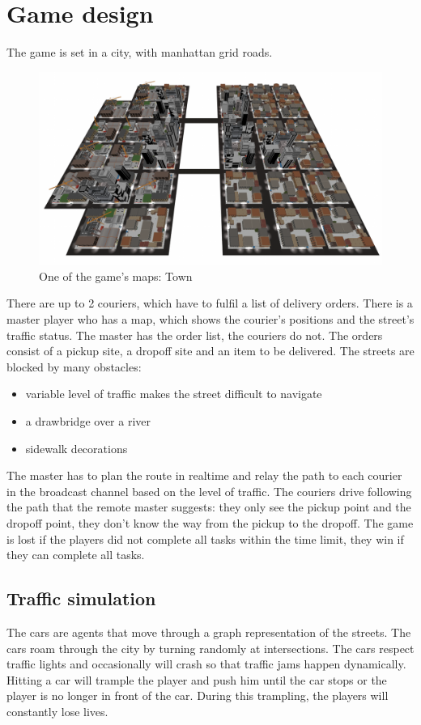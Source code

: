 \documentclass[12pt]{article}
\begin{document}
\section{Game design}
The game is set in a city, with manhattan grid roads.
\begin{figure}[H]
\includegraphics[width=\textwidth]{map_town}
\caption{One of the game's maps: Town}
\end{figure}
There are up to 2 couriers, which have to fulfil a list of delivery orders.
There is a master player who has a map, which shows the courier's positions and the street's traffic status. The master has the order list, the couriers do not.
The orders consist of a pickup site, a dropoff site and an item to be delivered.
The streets are blocked by many obstacles:
\begin{itemize}
  \item variable level of traffic makes the street difficult to navigate
  \item a drawbridge over a river
  \item sidewalk decorations
\end{itemize}
The master has to plan the route in realtime and relay the path to each courier in the broadcast channel based on the level of traffic.
The couriers drive following the path that the remote master suggests: they only see the pickup point and the dropoff point, they don't know the way from the pickup to the dropoff.
The game is lost if the players did not complete all tasks within the time limit, they win if they can complete all tasks.

\subsection{Traffic simulation}
The cars are agents that move through a graph representation of the streets. The cars roam through the city by turning randomly at intersections. The cars respect traffic lights and occasionally will crash so that traffic jams happen dynamically. Hitting a car will trample the player and push him until the car stops or the player is no longer in front of the car. During this trampling, the players will constantly lose lives.
\end{document}
